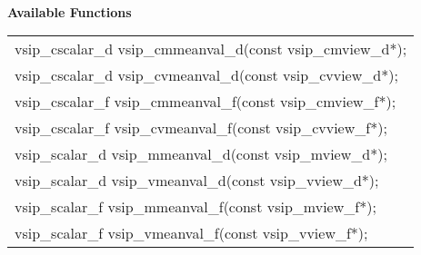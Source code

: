 \\\cvsiplh
\newline \hspace*{.8cm} \vspace*{.1cm} \textbf{Available Functions }
\newline \hspace*{1.1cm} {
\ttfamily
\begin{tabular}[H]{l}
vsip\_cscalar\_d vsip\_cmmeanval\_d(const vsip\_cmview\_d*);\\
vsip\_cscalar\_d vsip\_cvmeanval\_d(const vsip\_cvview\_d*);\\
vsip\_cscalar\_f vsip\_cmmeanval\_f(const vsip\_cmview\_f*);\\
vsip\_cscalar\_f vsip\_cvmeanval\_f(const vsip\_cvview\_f*);\\
vsip\_scalar\_d vsip\_mmeanval\_d(const vsip\_mview\_d*);\\
vsip\_scalar\_d vsip\_vmeanval\_d(const vsip\_vview\_d*);\\
vsip\_scalar\_f vsip\_mmeanval\_f(const vsip\_mview\_f*);\\
vsip\_scalar\_f vsip\_vmeanval\_f(const vsip\_vview\_f*);\\
\end{tabular}
}
\\\pyjvsiph
{}
